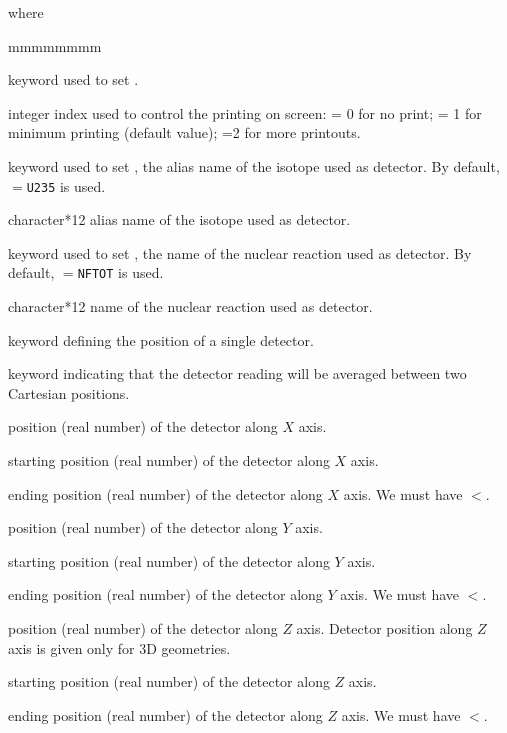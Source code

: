 \noindent where
\begin{ListeDeDescription}{mmmmmmmm}

\item[\moc{EDIT}] keyword used to set .

\item[\dusa{iprint}] integer index used to control the printing on screen:
 = 0 for no print; = 1 for minimum printing (default value); =2 for more printouts.

\item[\moc{DETNAME}] keyword used to set , the alias name of the isotope used as detector. By default, $=${\tt U235} is used.

\item[\dusa{dname}] character*12 alias name of the isotope used as detector.

\item[\moc{REANAME}] keyword used to set , the name of the nuclear reaction used as detector. By default, $=${\tt NFTOT} is used.

\item[\dusa{rname}] character*12 name of the nuclear reaction used as detector.

\item[\moc{POSITION}] keyword defining the position of a single detector.

\item[\moc{INTEG}] keyword indicating that the detector reading will be averaged between two Cartesian positions.

\item[\dusa{valx}] position (real number) of the detector along $X$ axis.

\item[\dusa{valx1}] starting position (real number) of the detector along $X$ axis.

\item[\dusa{valx2}] ending position (real number) of the detector along $X$ axis. We must have $<$.
 
\item[\dusa{valy}] position (real number) of the detector along $Y$ axis.

\item[\dusa{valy1}] starting position (real number) of the detector along $Y$ axis.

\item[\dusa{valy2}] ending position (real number) of the detector along $Y$ axis. We must have $<$.
 
\item[\dusa{valz}] position (real number) of the detector along $Z$ axis. Detector position along $Z$ axis is given only for 3D geometries.

\item[\dusa{valz1}] starting position (real number) of the detector along $Z$ axis.

\item[\dusa{valz2}] ending position (real number) of the detector along $Z$ axis. We must have $<$.

\end{ListeDeDescription}
\clearpage
